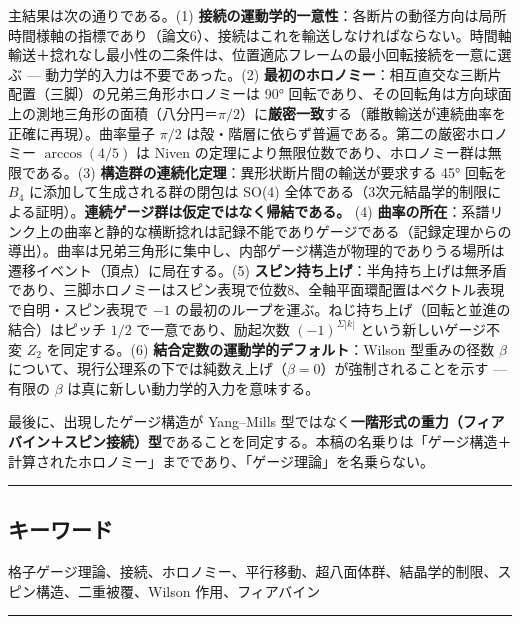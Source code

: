 \documentclass[
]{ltjsarticle}
\begin{document}
主結果は次の通りである。(1)
\textbf{接続の運動学的一意性}：各断片の動径方向は局所時間様軸の指標であり（論文6）、接続はこれを輸送しなければならない。時間軸輸送＋捻れなし最小性の二条件は、位置適応フレームの最小回転接続を一意に選ぶ
--- 動力学的入力は不要であった。(2)
\textbf{最初のホロノミー}：相互直交な三断片配置（三脚）の兄弟三角形ホロノミーは
90°
回転であり、その回転角は方向球面上の測地三角形の面積（八分円＝\(\pi/2\)）に\textbf{厳密一致}する（離散輸送が連続曲率を正確に再現）。曲率量子
\(\pi/2\) は殻・階層に依らず普遍である。第二の厳密ホロノミー
\(\arccos(4/5)\) は Niven
の定理により無限位数であり、ホロノミー群は無限である。(3)
\textbf{構造群の連続化定理}：異形状断片間の輸送が要求する 45° 回転を
\(B_4\) に添加して生成される群の閉包は SO(4)
全体である（3次元結晶学的制限による証明）。\textbf{連続ゲージ群は仮定ではなく帰結である。}
(4)
\textbf{曲率の所在}：系譜リンク上の曲率と静的な横断捻れは記録不能でありゲージである（記録定理からの導出）。曲率は兄弟三角形に集中し、内部ゲージ構造が物理的でありうる場所は遷移イベント（頂点）に局在する。(5)
\textbf{スピン持ち上げ}：半角持ち上げは無矛盾であり、三脚ホロノミーはスピン表現で位数8、全軸平面環配置はベクトル表現で自明・スピン表現で
\(-1\) の最初のループを運ぶ。ねじ持ち上げ（回転と並進の結合）はピッチ
\(1/2\) で一意であり、励起次数 \((-1)^{\Sigma|k|}\)
という新しいゲージ不変 \(Z_2\) を同定する。(6)
\textbf{結合定数の運動学的デフォルト}：Wilson 型重みの径数 \(\beta\)
について、現行公理系の下では純数え上げ（\(\beta=0\)）が強制されることを示す
--- 有限の \(\beta\) は真に新しい動力学的入力を意味する。

最後に、出現したゲージ構造が Yang--Mills
型ではなく\textbf{一階形式の重力（フィアバイン＋スピン接続）型}であることを同定する。本稿の名乗りは「ゲージ構造＋計算されたホロノミー」までであり、「ゲージ理論」を名乗らない。

\begin{center}\rule{0.5\linewidth}{0.5pt}\end{center}

\subsection{キーワード}\label{ux30adux30fcux30efux30fcux30c9}

格子ゲージ理論、接続、ホロノミー、平行移動、超八面体群、結晶学的制限、スピン構造、二重被覆、Wilson
作用、フィアバイン

\begin{center}\rule{0.5\linewidth}{0.5pt}\end{center}
\end{document}
